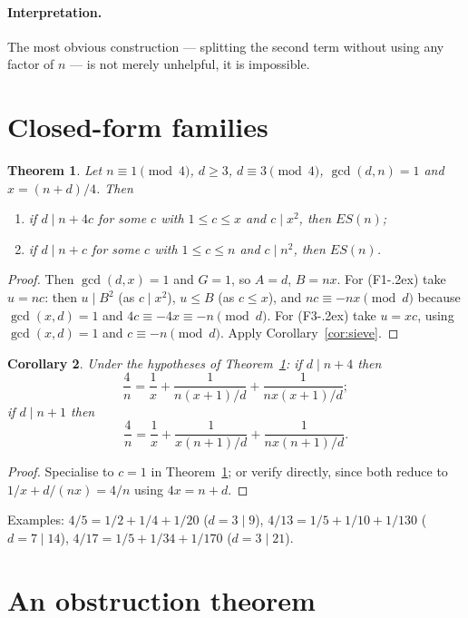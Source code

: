 \documentclass[11pt,a4paper]{article}
\newtheorem{theorem}{Theorem}
\newtheorem{corollary}[theorem]{Corollary}
\theoremstyle{definition}
\begin{document}
\paragraph{Interpretation.} The most obvious construction --- splitting the
second term without using any factor of $n$ --- is not merely unhelpful, it is
impossible.

\section{Closed-form families}\label{sec:closed}

\begin{theorem}\label{thm:closed}
Let $n\equiv 1\pmod 4$, $d\ge 3$, $d\equiv 3\pmod 4$, $\gcd(d,n)=1$ and
$x=(n+d)/4$. Then
\begin{enumerate}
\item[(F1\kern-.2ex\prime)] if $d\mid n+4c$ for some $c$ with $1\le c\le x$ and
  $c\mid x^{2}$, then $ES(n)$;
\item[(F3\kern-.2ex\prime)] if $d\mid n+c$ for some $c$ with $1\le c\le n$ and
  $c\mid n^{2}$, then $ES(n)$.
\end{enumerate}
\end{theorem}
\begin{proof}
Then $\gcd(d,x)=1$ and $G=1$, so $A=d$, $B=nx$. For (F1\kern-.2ex\prime) take
$u=nc$: then $u\mid B^{2}$ (as $c\mid x^{2}$), $u\le B$ (as $c\le x$), and
$nc\equiv -nx\pmod d$ because $\gcd(x,d)=1$ and $4c\equiv -4x\equiv -n\pmod d$.
For (F3\kern-.2ex\prime) take $u=xc$, using $\gcd(x,d)=1$ and $c\equiv -n\pmod d$.
Apply Corollary~\ref{cor:sieve}.
\end{proof}

\begin{corollary}
Under the hypotheses of Theorem~\ref{thm:closed}: if $d\mid n+4$ then
\[
  \frac4n=\frac1x+\frac{1}{n(x+1)/d}+\frac{1}{nx(x+1)/d};
\]
if $d\mid n+1$ then
\[
  \frac4n=\frac1x+\frac{1}{x(n+1)/d}+\frac{1}{nx(n+1)/d}.
\]
\end{corollary}
\begin{proof}
Specialise to $c=1$ in Theorem~\ref{thm:closed}; or verify directly, since both
reduce to $1/x+d/(nx)=4/n$ using $4x=n+d$.
\end{proof}

Examples: $4/5=1/2+1/4+1/20$ ($d=3\mid 9$),
$4/13=1/5+1/10+1/130$ ($d=7\mid 14$),
$4/17=1/5+1/34+1/170$ ($d=3\mid 21$).

\section{An obstruction theorem}\label{sec:obstruction}
\end{document}
